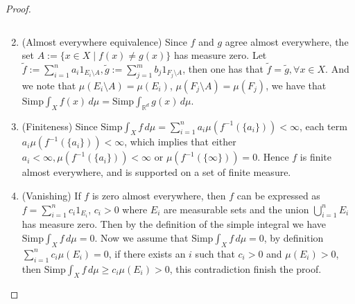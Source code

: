 \documentclass[a4paper]{article}
\begin{document}
\begin{proof}
\begin{enumerate}[label = (\roman*)]
$$    $$
    \item (Almost everywhere equivalence) Since $f$ and $g$ agree almost everywhere, the set $A := \{x \in X \mid f(x) \ne g(x)\}$
    has measure zero. Let $
    \tilde{f} := \sum_{i = 1}^n a_i1_{E_i \setminus A}, \tilde{g}:= \sum_{j = 1}^m  b_j1_{F_j \setminus A}
    $, then one has that $\tilde{f} = \tilde{g}, \forall x \in X$. And we note that $\mu(E_i \setminus A) = \mu(E_i)$,
    $\mu(F_j \setminus A) = \mu(F_j)$, we have that $\mathrm{Simp}\int_X f(x)\,d\mu = \mathrm{Simp}\int_{\mathbb{R}^d} g(x)\,d\mu$.
    \item (Finiteness) Since $\mathrm{Simp}\int_X f \,d\mu = \sum_{i = 1}^n a_i\mu(f^{-1}(\{a_i\})) < \infty$, each
    term $a_i\mu(f^{-1}(\{a_i\})) < \infty$, which implies that either $a_i < \infty, \mu(f^{-1}(\{a_i\})) < \infty$ 
    or $\mu(f^{-1}(\{\infty\})) = 0$. Hence $f$ is finite almost everywhere, and is supported on a set of finite measure.
    \item (Vanishing) If $f$ is zero almost everywhere, then $f$ can be expressed as $f = \sum_{i = 1}^n c_i1_{E_i}$,
    $c_i > 0$
    where $E_i$ are measurable sets and the union $\bigcup_{i = 1}^n E_i$ has measure zero. Then by the 
    definition of the simple integral we have $\mathrm{Simp}\int_X f\,d\mu = 0$.  Now we assume that
    $\mathrm{Simp}\int_X f\,d\mu = 0$, by definition $\sum_{i = 1}^n c_i\mu(E_i) = 0$, if there exists 
    an $i$ such that $c_i > 0$ and $\mu(E_i) > 0$, then $\mathrm{Simp}\int_X f \,d\mu \geq c_i\mu(E_i) > 0$,
    this contradiction finish the proof.\qedhere
\end{enumerate}
\end{proof}
\end{document}
